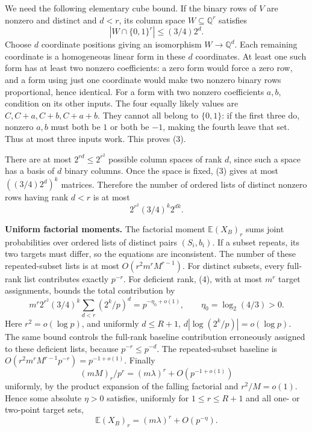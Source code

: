 We need the following elementary cube bound. If the binary rows of $V$ are nonzero and distinct and $d<r$, its column space $W\subseteq\mathbb Q^r$ satisfies
\[
 |W\cap\{0,1\}^r|\leq(3/4)2^d.                         \tag{3}
\]
Choose $d$ coordinate positions giving an isomorphism $W\to\mathbb Q^d$. Each remaining coordinate is a homogeneous linear form in these $d$ coordinates. At least one such form has at least two nonzero coefficients: a zero form would force a zero row, and a form using just one coordinate would make two nonzero binary rows proportional, hence identical.
For a form with two nonzero coefficients $a,b$, condition on its other inputs. The four equally likely values are $C,C+a,C+b,C+a+b$. They cannot all belong to $\{0,1\}$: if the first three do, nonzero $a,b$ must both be $1$ or both be $-1$, making the fourth leave that set. Thus at most three inputs work. This proves (3).

There are at most $2^{rd}\leq2^{r^2}$ possible column spaces of rank $d$, since such a space has a basis of $d$ binary columns. Once the space is fixed, (3) gives at most $((3/4)2^d)^k$ matrices. Therefore the number of ordered lists of distinct nonzero rows having rank $d<r$ is at most
\[
 2^{r^2}(3/4)^k2^{dk}.                                 \tag{4}
\]

\textbf{Uniform factorial moments.}
The factorial moment $\mathbb E(X_B)_r$ sums joint probabilities over ordered lists of distinct pairs $(S_i,b_i)$. If a subset repeats, its two targets must differ, so the equations are inconsistent. The number of these repeated-subset lists is at most $O(r^2m^rM^{r-1})$.
For distinct subsets, every full-rank list contributes exactly $p^{-r}$. For deficient rank, (4), with at most $m^r$ target assignments, bounds the total contribution by
\[
 m^r2^{r^2}(3/4)^k
       \sum_{d<r}(2^k/p)^d=p^{-\eta_0+o(1)},\qquad
 \eta_0=\log_2(4/3)>0.                                 \tag{5}
\]
Here $r^2=o(\log p)$, and uniformly $d\leq R+1$,
$d|\log(2^k/p)|=o(\log p)$. The same bound controls the full-rank baseline contribution erroneously assigned to these deficient lists, because $p^{-r}\leq p^{-d}$.
The repeated-subset baseline is $O(r^2m^rM^{r-1}p^{-r})=p^{-1+o(1)}$.
Finally
\[
 (mM)_r/p^r=(m\lambda)^r+O(p^{-1+o(1)})
\]
uniformly, by the product expansion of the falling factorial and $r^2/M=o(1)$.
Hence some absolute $\eta>0$ satisfies, uniformly for $1\leq r\leq R+1$ and all one- or two-point target sets,
\[
 \mathbb E(X_B)_r=(m\lambda)^r+O(p^{-\eta}).             \tag{6}
\]

